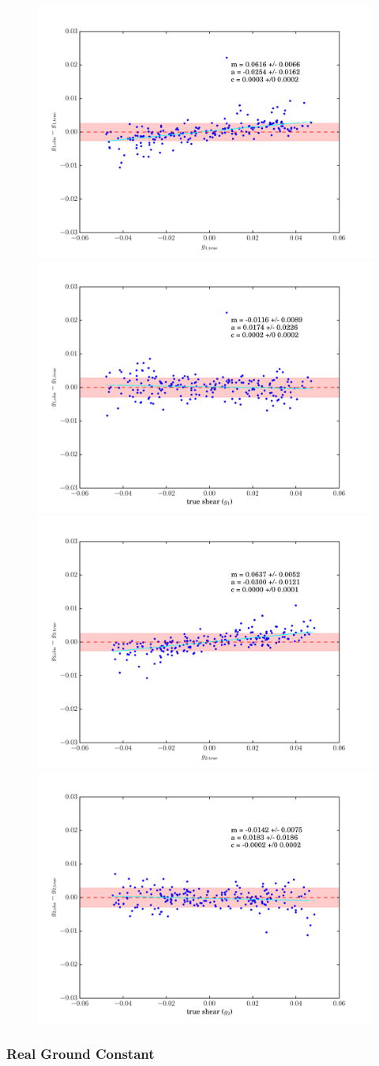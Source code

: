 \documentclass[iop]{emulateapj}
\begin{document}
\begin{figure}[t]
\begin{center}
\includegraphics[width=0.48\linewidth]{./Plots/m1-no_corrections-rgc-fixedaber-regauss.pdf}
\includegraphics[width=0.48\linewidth]{./Plots/m1-rgc-fixedaber-regauss-opt-shear_plots.pdf}
\includegraphics[width=0.48\linewidth]{./Plots/m2-no_corrections-rgc-fixedaber-regauss.pdf}
\includegraphics[width=0.48\linewidth]{./Plots/m2-rgc-fixedaber-regauss-opt-shear_plots.pdf}
\end{center}
\end{figure}


\subsubsection{Real Ground Constant}
\end{document}
